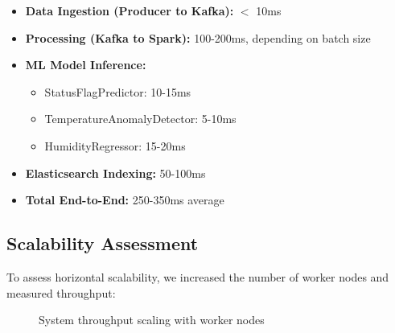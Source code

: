 \documentclass[11pt, a4paper]{article}
\begin{document}
\begin{itemize}[leftmargin=*]
  \item \textbf{Data Ingestion (Producer to Kafka):} $<$ 10ms
  \item \textbf{Processing (Kafka to Spark):} 100-200ms, depending on batch size
  \item \textbf{ML Model Inference:} 
    \begin{itemize}
      \item StatusFlagPredictor: 10-15ms
      \item TemperatureAnomalyDetector: 5-10ms 
      \item HumidityRegressor: 15-20ms
    \end{itemize}
  \item \textbf{Elasticsearch Indexing:} 50-100ms
  \item \textbf{Total End-to-End:} 250-350ms average
\end{itemize}

\clearpage
\subsection{Scalability Assessment}
To assess horizontal scalability, we increased the number of worker nodes and measured throughput:

\begin{figure}[h]
  \centering
  \caption{System throughput scaling with worker nodes}
  \label{fig:scaling_chart}
\end{figure}
\end{document}
